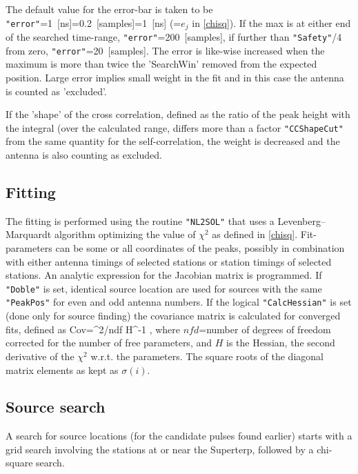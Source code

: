 The default value for the error-bar is taken to be \verb!"error"!=1~[ns]=0.2~[samples]=1~[ns] (=$e_j$ in \eqref{chisq}). If the max is at either end of the searched time-range, \verb!"error"!=200~[samples], if further than \verb!"Safety"!/4 from zero, \verb!"error"!=20~[samples]. The error is like-wise increased when the maximum is more than twice the 'SearchWin' removed from the expected position. Large error implies small weight in the fit and in this case the antenna is counted as 'excluded'.

If the 'shape' of the cross correlation, defined as the ratio of the peak height with the integral (over the calculated range, differs more than a factor \verb!"CCShapeCut"! from the same quantity for the self-correlation, the weight is decreased and the antenna is also counting as excluded.

\subsection{Fitting}

The fitting is performed using the routine \verb!"NL2SOL"!\cite{nl2sol} that uses a Levenberg--Marquardt algorithm optimizing the value of $\chi^2$ as defined in \eqref{chisq}. Fit-parameters can be some or all coordinates of the peaks, possibly in combination with either antenna timings of selected stations or station timings of selected stations. An analytic expression for the Jacobian matrix is programmed. If \verb!"Doble"! is set, identical source location are used for sources with the same \verb!"PeakPos"! for even and odd antenna numbers. If the logical \verb!"CalcHessian"! is set (done only for source finding) the covariance matrix is calculated for converged fits, defined as
\beq
{\rm Cov}=\chi^2/ndf \times H^{-1} \;,
\eeq
where $nfd$=number of degrees of freedom corrected for the number of free parameters, and $H$ is the Hessian, the second derivative of the $\chi^2$ w.r.t. the parameters. The square roots of the diagonal matrix elements as kept as $\sigma(i)$.

\subsection{Source search}

A search for source locations (for the candidate pulses found earlier) starts with a grid search involving the stations at or near the Superterp, followed by a chi-square search.


